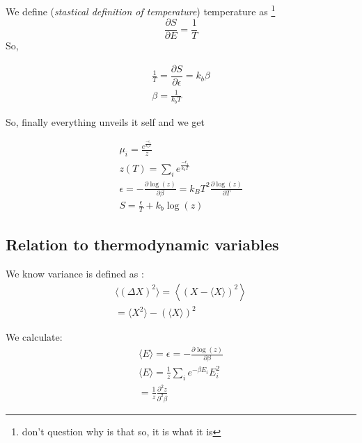 \documentclass{tufte-handout}
\begin{document}
We define (\textit{stastical definition of temperature}) temperature as 
\footnote{don't question why is that so, it is what it is}
\[\dfrac{\partial S}{\partial E} = \frac{1}{T}\]
So, 

\[\begin{gathered}
	\frac{1}{T} = \dfrac{\partial S}{\partial \epsilon} = k_b \beta\\
	\beta = \frac{1}{k_b T} 
\end{gathered}\]

So, finally everything unveils it self and we get 
\begin{main_equations}
\[
\begin{gathered}
	\mu_i = \frac{e^{\frac{-\epsilon_i}{k_b T}}}{z}\\
	z(T) = \sum_{i} e^{\frac{-\epsilon_i}{k_b T}}\\
	\epsilon = -\frac{\partial \log(z)}{\partial \beta} = 
	k_B T^2 \frac{\partial \log(z)}{\partial T}\\
	S = \frac{\epsilon}{T} + k_b \log(z)
\end{gathered}
\]
\end{main_equations}

\subsection{Relation to thermodynamic variables}

We know variance is defined as :
\[\begin{gathered}
	\langle (\Delta X)^2 \rangle= \left\langle (X - \langle X\rangle)^2\right \rangle\\
	 = \langle X^2 \rangle - (\langle X \rangle)^2
\end{gathered}\]

We calculate:
\[\begin{gathered}
	\langle E \rangle = \epsilon = -\frac{\partial \log(z)}{\partial \beta}\\
	\langle E \rangle = \frac{1}{z}\sum_i e^{-\beta E_i} E_i ^2 \\
	= \frac{1}{z} \frac{\partial^2 z}{\partial^2 \beta}
\end{gathered}\]
\end{document}
